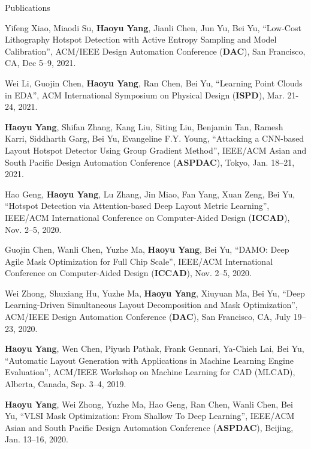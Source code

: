\begin{rSection}{Publications}
\begin{description}[font=\normalfont]
	
	\item[{[C20]}] Yifeng Xiao, Miaodi Su, \textbf{Haoyu Yang}, Jianli Chen, Jun Yu, Bei Yu,
	``Low-Cost Lithography Hotspot Detection with Active Entropy Sampling and Model Calibration'',
	ACM/IEEE Design Automation Conference (\textbf{DAC}), San Francisco, CA, Dec 5–9, 2021.
	
	\item[{[C19]}] Wei Li, Guojin Chen, \textbf{Haoyu Yang}, Ran Chen, Bei Yu,
	``Learning Point Clouds in EDA'', ACM International Symposium on Physical Design (\textbf{ISPD}), Mar. 21-24, 2021.

	\item[{[C18]}] \textbf{Haoyu Yang}, Shifan Zhang, Kang Liu, Siting Liu, Benjamin Tan, Ramesh Karri, Siddharth Garg, Bei Yu, Evangeline F.Y. Young,
	``Attacking a CNN-based Layout Hotspot Detector Using Group Gradient Method'', 
	IEEE/ACM Asian and South Pacific Design Automation Conference (\textbf{ASPDAC}), Tokyo, Jan. 18–21, 2021.

    \item[{[C17]}] Hao Geng, \textbf{Haoyu Yang}, Lu Zhang, Jin Miao, Fan Yang, Xuan Zeng, Bei Yu, 
    ``Hotspot Detection via Attention-based Deep Layout Metric Learning'', 
    IEEE/ACM International Conference on Computer-Aided Design (\textbf{ICCAD}), Nov. 2–5, 2020.
    
    \item[{[C16]}] Guojin Chen, Wanli Chen, Yuzhe Ma, \textbf{Haoyu Yang}, Bei Yu,
     ``DAMO: Deep Agile Mask Optimization for Full Chip Scale'', 
     IEEE/ACM International Conference on Computer-Aided Design (\textbf{ICCAD}), Nov. 2–5, 2020.
	
	\item[{[C15]}] Wei Zhong, Shuxiang Hu, Yuzhe Ma, \textbf{Haoyu Yang}, Xiuyuan Ma, Bei Yu, 
	``Deep Learning-Driven Simultaneous Layout Decomposition and Mask Optimization'', 
	ACM/IEEE Design Automation Conference (\textbf{DAC}), San Francisco, CA, July 19–23, 2020.
	
	\item[{[C14]}] \textbf{Haoyu Yang}, Wen Chen, Piyush Pathak, Frank Gennari, Ya-Chieh Lai, Bei Yu, 
	``Automatic Layout Generation with Applications in Machine Learning Engine Evaluation'', 
	ACM/IEEE Workshop on Machine Learning for CAD (MLCAD), Alberta, Canada, Sep. 3–4, 2019.
	
	
	\item[{[C13]}] \textbf{Haoyu Yang}, Wei Zhong, Yuzhe Ma, Hao Geng, Ran Chen, Wanli Chen, Bei Yu,
	 ``VLSI Mask Optimization: From Shallow To Deep Learning'', 
	 IEEE/ACM Asian and South Pacific Design Automation Conference (\textbf{ASPDAC}), Beijing, Jan. 13–16, 2020.


\end{description}
\end{rSection}
